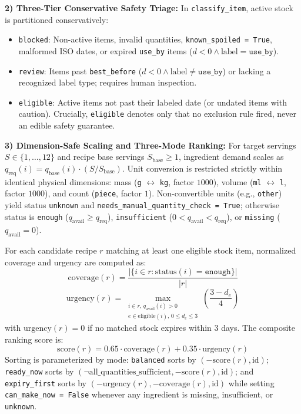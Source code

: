 \documentclass[conference]{IEEEtran}
\begin{document}
\textbf{2) Three-Tier Conservative Safety Triage:} In \texttt{classify\_item}, active stock is partitioned conservatively:
\begin{itemize}
    \item \texttt{blocked}: Non-active items, invalid quantities, \texttt{known\_spoiled = True}, malformed ISO dates, or expired \texttt{use\_by} items ($d < 0 \land \text{label} = \texttt{use\_by}$).
    \item \texttt{review}: Items past \texttt{best\_before} ($d < 0 \land \text{label} \neq \texttt{use\_by}$) or lacking a recognized label type; requires human inspection.
    \item \texttt{eligible}: Active items not past their labeled date (or undated items with caution). Crucially, \texttt{eligible} denotes only that no exclusion rule fired, never an edible safety guarantee.
\end{itemize}

\textbf{3) Dimension-Safe Scaling and Three-Mode Ranking:} For target servings $S \in \{1,\dots,12\}$ and recipe base servings $S_{\text{base}} \ge 1$, ingredient demand scales as $q_{\text{req}}(i) = q_{\text{base}}(i) \cdot (S / S_{\text{base}})$. Unit conversion is restricted strictly within identical physical dimensions: mass (\texttt{g} $\leftrightarrow$ \texttt{kg}, factor $1000$), volume (\texttt{ml} $\leftrightarrow$ \texttt{l}, factor $1000$), and count (\texttt{piece}, factor $1$). Non-convertible units (e.g., \texttt{other}) yield status \texttt{unknown} and \texttt{needs\_manual\_quantity\_check = True}; otherwise status is \texttt{enough} ($q_{\text{avail}} \ge q_{\text{req}}$), \texttt{insufficient} ($0 < q_{\text{avail}} < q_{\text{req}}$), or \texttt{missing} ($q_{\text{avail}} = 0$).

For each candidate recipe $r$ matching at least one eligible stock item, normalized coverage and urgency are computed as:
\begin{equation}
\text{coverage}(r) = \frac{|\{i \in r : \text{status}(i) = \texttt{enough}\}|}{|r|}
\end{equation}
\begin{equation}
\text{urgency}(r) = \max_{\substack{i \in r,\, q_{\text{avail}}(i) > 0 \\ e \in \text{eligible}(i),\, 0 \le d_e \le 3}} \left(\frac{3 - d_e}{4}\right)
\end{equation}
with $\text{urgency}(r) = 0$ if no matched stock expires within 3 days. The composite ranking score is:
\begin{equation}
\text{score}(r) = 0.65 \cdot \text{coverage}(r) + 0.35 \cdot \text{urgency}(r)
\end{equation}
Sorting is parameterized by mode: \texttt{balanced} sorts by $(-\text{score}(r), \text{id})$; \texttt{ready\_now} sorts by $(\neg \text{all\_quantities\_sufficient}, -\text{score}(r), \text{id})$; and \texttt{expiry\_first} sorts by $(-\text{urgency}(r), -\text{coverage}(r), \text{id})$ while setting \texttt{can\_make\_now = False} whenever any ingredient is missing, insufficient, or \texttt{unknown}.
\end{document}
